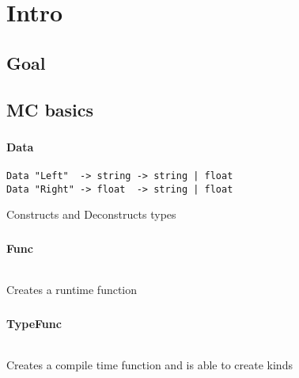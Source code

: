 \section{Intro}
\subsection{Goal}

\subsection{MC basics}

\begin{frame}[fragile]
   \frametitle{\subsecname}
   \framesubtitle{Data}

   \begin{lstlisting}
Data "Left"  -> string -> string | float
Data "Right" -> float  -> string | float
   \end{lstlisting}
   Constructs and Deconstructs types
\end{frame}

\begin{frame}[fragile]
   \frametitle{\subsecname}
   \framesubtitle{Func}

   \begin{lstlisting}

   \end{lstlisting}
   Creates a runtime function
\end{frame}

\begin{frame}[fragile]
   \frametitle{\subsecname}
   \framesubtitle{TypeFunc}

   \begin{lstlisting}

   \end{lstlisting}
   Creates a compile time function and is able to create kinds
\end{frame}

